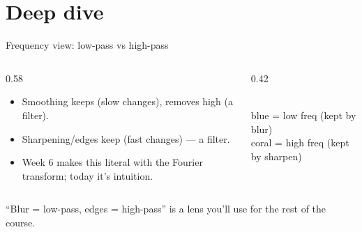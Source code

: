 \documentclass[10pt,aspectratio=169]{beamer}
\begin{document}
\section{Deep dive}

\begin{frame}{Frequency view: low-pass vs high-pass}
  \begin{columns}[T]
    \begin{column}{0.58\textwidth}
      \begin{itemize}
        \item Smoothing keeps  (slow changes), removes high (a  filter).
        \item Sharpening/edges keep  (fast changes) — a  filter.
        \item Week 6 makes this literal with the Fourier transform; today it's intuition.
      \end{itemize}
    \end{column}
    \begin{column}{0.42\textwidth}
      \begin{center}
      \\
      {\scriptsize blue = low freq (kept by blur)\\ coral = high freq (kept by sharpen)}
      \end{center}
    \end{column}
  \end{columns}
  \begin{goodbox}
    ``Blur = low-pass, edges = high-pass'' is a lens you'll use for the rest of the course.
  \end{goodbox}
\end{frame}
\end{document}
